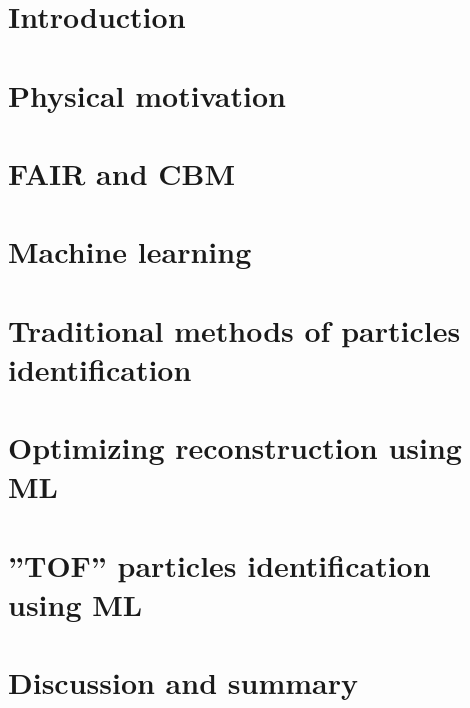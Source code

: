 \documentclass[12pt,a4paper,twoside]{book}
\numberwithin{equation}{chapter} %
\begin{document}


\tableofcontents
{}
\pagestyle{empty}

\chapter{Introduction}
\thispagestyle{fancy}


\chapter{Physical motivation}
\thispagestyle{fancy}

\chapter{FAIR and CBM}

\chapter{Machine learning}

\chapter{Traditional methods of particles identification}

\chapter{Optimizing \PKshort reconstruction using ML}

\chapter{''TOF'' particles identification using ML}

\chapter{Discussion and summary}




\listoffigures
\thispagestyle{fancy}

\listoftables
\thispagestyle{fancy}
\end{document}
